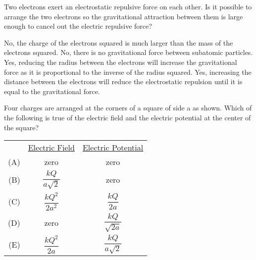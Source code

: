 \documentclass{../../../oss-ap12ibhl}
\begin{document}
\begin{questions}
  \question Two electrons exert an electrostatic repulsive force on each other.
  Is it possible to arrange the two electrons so the gravitational attraction
  between them is large enough to cancel out the electric repulsive force?
  \begin{choices}
    \choice  No, the charge of the electrons squared is much larger than the
    mass of the electrons squared.
    \choice No, there is no gravitational force between subatomic particles.
    \choice Yes, reducing the radius between the electrons will increase the
    gravitational force as it is proportional to the inverse of the radius
    squared.
    \choice Yes, increasing the distance between the electrons will reduce the
    electrostatic repulsion until it is equal to the gravitational force.
  \end{choices}
  \vspace{.7in}
    
  \question Four charges are arranged at the corners of a square of side a as
  shown. Which of the following is true of the electric field and the electric
  potential at the center of the square?

  \vspace{.1in}
  \begin{minipage}{.3\linewidth}
  \end{minipage}
  \begin{minipage}{.5\linewidth}
    \begin{tabular}{rcc}
      & \underline{Electric Field} & \underline{Electric Potential}\\
      (A) & zero & zero \\
      (B) & $\dfrac{kQ}{a\sqrt{2}}$ & zero \\
      (C) & $\dfrac{kQ^2}{2a^2}$ &  $\dfrac{kQ}{2a}$\\
      (D) & zero &  $\dfrac{kQ}{\sqrt{2a}}$\\
      (E) & $\dfrac{kQ^2}{2a}$ & $\dfrac{kQ}{a\sqrt{2}}$
    \end{tabular}
  \end{minipage}
    

\end{questions}
\end{document}
